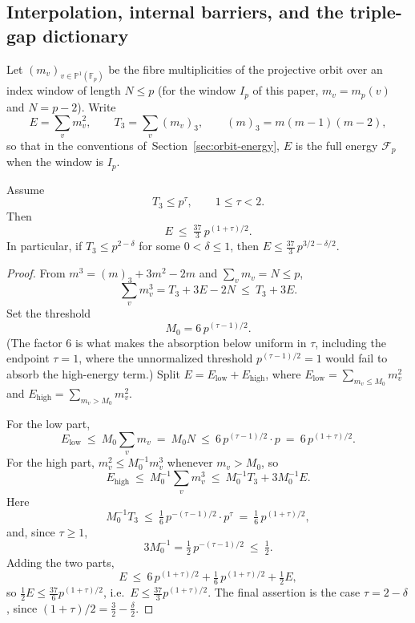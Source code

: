 \subsection{Interpolation, internal barriers, and the triple-gap
dictionary}
\label{sec:sh-interp}

Let $(m_v)_{v\in\mathbb P^1(\mathbb F_p)}$ be the fibre multiplicities
of the projective orbit over an index window of length $N\le p$ (for the
window $I_p$ of this paper, $m_v=m_p(v)$ and $N=p-2$).  Write
\[
 E=\sum_vm_v^2,
 \qquad
 T_3=\sum_v(m_v)_3,
 \qquad
 (m)_3=m(m-1)(m-2),
\]
so that in the conventions
of~Section~\ref{sec:orbit-energy}, $E$ is the full energy
$\mathcal F_p$ when the window is $I_p$.

\begin{theorem}
\label{thm:sh-t3-interp}
Assume
\[
 T_3\le p^{\tau},\qquad 1\le\tau<2 .
\]
Then
\[
 E\ \le\ \tfrac{37}{3}\,p^{(1+\tau)/2}.
\]
In particular, if $T_3\le p^{2-\delta}$ for some $0<\delta\le1$, then
$E\le\tfrac{37}3\,p^{3/2-\delta/2}$.
\end{theorem}

\begin{proof}
From $m^3=(m)_3+3m^2-2m$ and $\sum_vm_v=N\le p$,
\[
 \sum_vm_v^3=T_3+3E-2N\ \le\ T_3+3E .
\]
Set the threshold
\[
 M_0=6\,p^{(\tau-1)/2}.
\]
(The factor $6$ is what makes the absorption below uniform in $\tau$,
including the endpoint $\tau=1$, where the unnormalized threshold
$p^{(\tau-1)/2}=1$ would fail to absorb the high-energy term.)
Split $E=E_{\mathrm{low}}+E_{\mathrm{high}}$, where
$E_{\mathrm{low}}=\sum_{m_v\le M_0}m_v^2$ and
$E_{\mathrm{high}}=\sum_{m_v>M_0}m_v^2$.

For the low part,
\[
 E_{\mathrm{low}}\ \le\ M_0\sum_vm_v\ =\ M_0N
 \ \le\ 6\,p^{(\tau-1)/2}\cdot p\ =\ 6\,p^{(1+\tau)/2}.
\]
For the high part, $m_v^2\le M_0^{-1}m_v^3$ whenever $m_v>M_0$, so
\[
 E_{\mathrm{high}}\ \le\ M_0^{-1}\sum_vm_v^3
 \ \le\ M_0^{-1}T_3+3M_0^{-1}E .
\]
Here
\[
 M_0^{-1}T_3\ \le\ \tfrac16\,p^{-(\tau-1)/2}\cdot p^{\tau}
 \ =\ \tfrac16\,p^{(1+\tau)/2},
\]
and, since $\tau\ge1$,
\[
 3M_0^{-1}=\tfrac12\,p^{-(\tau-1)/2}\ \le\ \tfrac12 .
\]
Adding the two parts,
\[
 E\ \le\ 6\,p^{(1+\tau)/2}+\tfrac16\,p^{(1+\tau)/2}+\tfrac12E,
\]
so $\tfrac12E\le\tfrac{37}6p^{(1+\tau)/2}$, i.e.\
$E\le\tfrac{37}3p^{(1+\tau)/2}$.  The final assertion is the case
$\tau=2-\delta$, since $(1+\tau)/2=\tfrac32-\tfrac\delta2$.
\end{proof}

